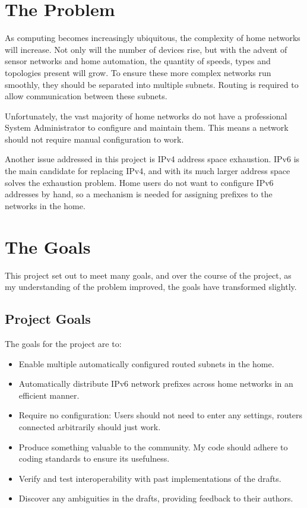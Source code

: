 \documentclass[12pt,a4paper,twoside]{report}
\begin{document}
\section{The Problem}
As computing becomes increasingly ubiquitous, the complexity of home networks
will increase. Not only will the number of devices rise, but with the advent of
sensor networks and home automation, the quantity of speeds, types and
topologies present will grow. To ensure these more complex networks run
smoothly, they should be separated into multiple subnets. Routing is required
to allow communication between these subnets. 

Unfortunately, the vast majority of home networks do not have a professional
System Administrator to configure and maintain them. This means a network
should not require manual configuration to work.

Another issue addressed in this project is IPv4  address space exhaustion. IPv6 is the main candidate for
replacing IPv4, and with its much larger address space solves the exhaustion
problem. Home users do not want to configure IPv6 addresses by hand, so a
mechanism is needed for assigning prefixes to the networks in the home. 

\section{The Goals}
This project set out to meet many goals, and over the course of the project, as
my understanding of the problem improved, the goals have transformed slightly.

\subsection{Project Goals}
The goals for the project are to:

\begin{itemize}
\item Enable multiple automatically configured routed subnets in the home.
\item Automatically distribute IPv6 network prefixes across home networks in an efficient
	manner. 
\item Require no configuration: Users should not need to enter any settings,
  routers connected arbitrarily should just work.
\item Produce something valuable to the community. My code should
  adhere to coding standards to ensure its usefulness.
\item Verify and test interoperability with past implementations of the drafts.
\item Discover any ambiguities in the drafts, providing feedback to their authors.
\end{itemize}
\end{document}
